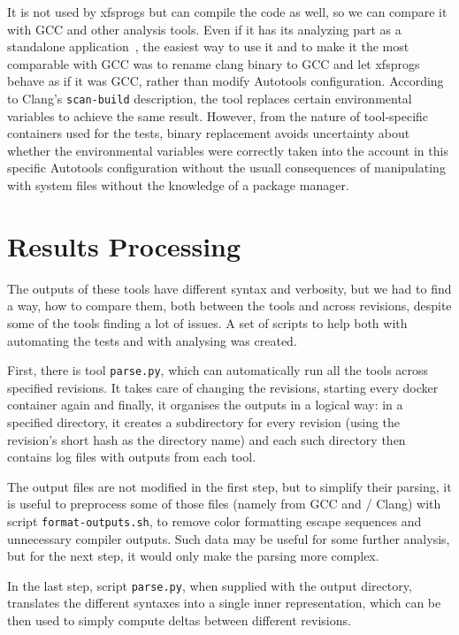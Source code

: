 It is not used by xfsprogs but can compile the code as well, so we can compare
it with GCC and other analysis tools. Even if it has its analyzing part as a
standalone application~\cite{ClangAnalyser}, the easiest way to use it and to
make it the most comparable with GCC was to rename clang binary to GCC and let
xfsprogs behave as if it was GCC, rather than modify Autotools configuration.
According to Clang's {\tt scan-build} description, the tool replaces certain
environmental variables to achieve the same result. However, from the nature of
tool-specific containers used for the tests, binary replacement avoids
uncertainty about whether the environmental variables were correctly taken into
the account in this specific Autotools configuration without the usuall
consequences of manipulating with system files without the knowledge of a
package manager.

\section{Results Processing}\label{chap:techniques:processing}
The outputs of these tools have different syntax and verbosity, but we had to
find a way, how to compare them, both between the tools and across revisions,
     despite some of the tools finding a lot of issues. A set of
     scripts to help both with automating the tests and with analysing was
     created.

First, there is tool {\tt parse.py}, which can automatically run all the tools
across specified revisions. It takes care of changing the revisions, starting
every docker container again and finally, it organises the outputs in a logical
way: in a specified directory, it creates a subdirectory for every revision
(using the revision's short hash as the directory name) and each such directory
then contains log files with outputs from each tool.

The output files are not modified in the first step, but to simplify their
parsing, it is useful to preprocess some of those files (namely from GCC and
	/						 Clang) with script
{\tt format-outputs.sh}, to remove color formatting escape sequences and
unnecessary compiler outputs.  Such data may be useful for some further
analysis, but for the next step, it would only make the parsing more complex.

In the last step, script {\tt parse.py}, when supplied with the output
directory, translates the different syntaxes into a single inner
representation, which can be then used to simply compute deltas between
different revisions.

